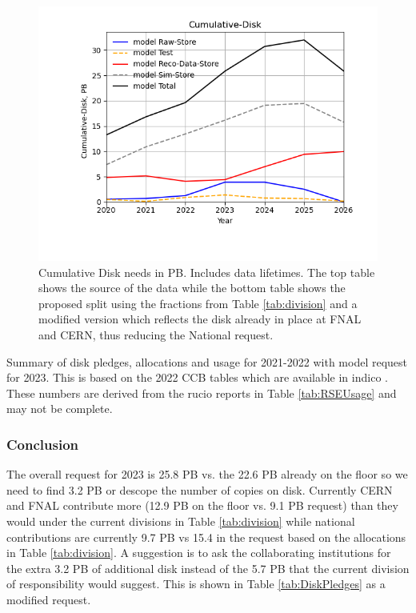 \documentclass[12pt]{article}
\begin{document}
\begin{figure}[h]
\centering\includegraphics[height=0.5\textwidth]{MoreSim_2022-11-21-2026/MoreSim_2022-11-21-2026-Cumulative-Disk.png}
\caption{Cumulative Disk needs in PB. Includes data lifetimes.  The top table shows the source of the data while the bottom table  shows the proposed split using the fractions from Table \ref{tab:division} and a modified version which reflects the disk already in place at FNAL and CERN, thus reducing the National request. }\label{fig:Cumulative-Disk}
\end{figure}




\begin{table}[ht]
\centering{}
\caption{Summary of disk pledges, allocations and usage for 2021-2022 with model request for 2023.  This is based on the 2022 CCB tables which are available in indico  \cite{CCB2022,CCB2023}.  These numbers are derived from the rucio reports in Table \ref{tab:RSEUsage} and may not be complete.  }
\label{tab:DiskPledges}
\end{table}

\subsubsection{Conclusion}\label{sec:diskresult}
The overall request for 2023 is 25.8 PB vs. the 22.6 PB already on the floor so we need to find 3.2 PB or descope the number of copies on disk. Currently CERN and FNAL contribute more  (12.9 PB on the floor vs. 9.1 PB request) than they would under the current divisions in Table \ref{tab:division} while national contributions are currently 9.7 PB vs 15.4 in the request based on the allocations in Table \ref{tab:division}.   A suggestion is to ask the collaborating institutions for the extra  3.2 PB of additional disk instead of the 5.7 PB that the current division of responsibility would suggest.  This is shown in Table \ref{tab:DiskPledges} as a modified request.
\end{document}
